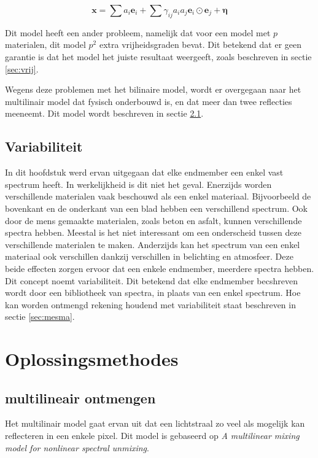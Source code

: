 \documentclass[12pt]{report}
\begin{document}
\begin{equation}
\bm{x} = \sum a_i \bm{e}_i + \sum \gamma_{ij} a_i a_j \bm{e}_i \odot \bm{e}_j + \bm{\eta}
\end{equation}

Dit model heeft een ander probleem, namelijk dat voor een model met $p$ materialen, dit model $p^2$ extra vrijheidsgraden bevat. Dit betekend dat er geen garantie is dat het model het juiste resultaat weergeeft, zoals beschreven in sectie \ref{sec:vrij}. 

Wegens deze problemen met het bilinaire model, wordt er overgegaan naar het multilinair model dat fysisch onderbouwd is, en dat meer dan twee reflecties meeneemt. Dit model wordt beschreven in sectie \ref{sec:multi}.

\section{Variabiliteit}\label{sec:select}

In dit hoofdstuk werd ervan uitgegaan dat elke endmember een enkel vast spectrum heeft. In werkelijkheid is dit niet het geval. Enerzijds worden verschillende materialen vaak beschouwd als een enkel materiaal. Bijvoorbeeld de bovenkant en de onderkant van een blad hebben een verschillend spectrum. Ook door de mens gemaakte materialen, zoals beton en asfalt, kunnen verschillende spectra hebben. Meestal is het niet interessant om een onderscheid tussen deze verschillende materialen te maken. Anderzijds kan het spectrum van een enkel materiaal ook verschillen dankzij verschillen in belichting en atmosfeer. Deze beide effecten zorgen ervoor dat een enkele endmember, meerdere spectra hebben. Dit concept noemt variabiliteit. Dit betekend dat elke endmember becshreven wordt door een bibliotheek van spectra, in plaats van een enkel spectrum. Hoe kan worden ontmengd rekening houdend met variabiliteit staat beschreven in sectie \ref{sec:mesma}. 

\chapter{Oplossingsmethodes} 

\section{multilineair ontmengen} \label{sec:multi}

Het multilinair model gaat ervan uit dat een lichtstraal zo veel als mogelijk kan reflecteren in een enkele pixel. Dit model is gebaseerd op \textit{A multilinear mixing model for nonlinear spectral unmixing}\cite{mlinmix}. 
\end{document}
